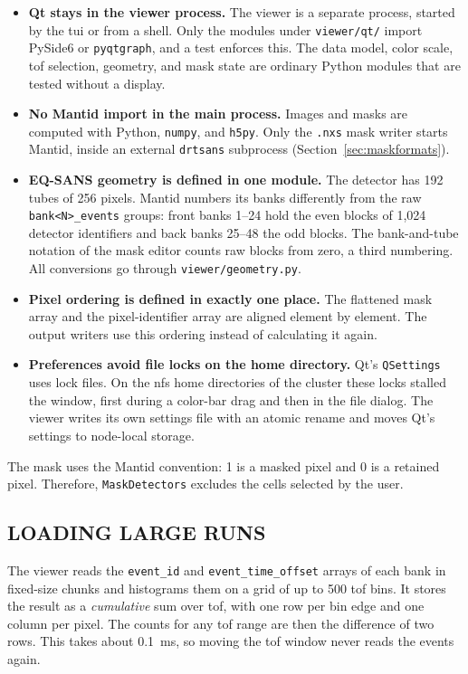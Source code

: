 \documentclass[tm]{ornltm}
\begin{document}
\begin{itemize}
  \item \textbf{Qt stays in the viewer process.} The viewer is a separate
    process, started by the \ac{tui} or from a shell. Only the modules under
    \texttt{viewer/qt/} import PySide6 or \texttt{pyqtgraph}, and a test
    enforces this. The data model, color scale, \ac{tof} selection, geometry,
    and mask state are ordinary Python modules that are tested without a
    display.
  \item \textbf{No Mantid import in the main process.} Images and masks are
    computed with Python, \texttt{numpy}, and \texttt{h5py}. Only the
    \texttt{.nxs} mask writer starts Mantid, inside an external
    \texttt{drtsans} subprocess (Section~\ref{sec:maskformats}).
  \item \textbf{EQ-SANS geometry is defined in one module.} The detector has
    192 tubes of 256 pixels. Mantid numbers its banks differently from the raw
    \texttt{bank<N>\_events} groups: front banks 1--24 hold the even blocks of
    1,024 detector identifiers and back banks 25--48 the odd blocks. The
    bank-and-tube notation of the mask editor counts raw blocks from zero, a
    third numbering. All conversions go through \texttt{viewer/geometry.py}.
  \item \textbf{Pixel ordering is defined in exactly one place.} The flattened
    mask array and the pixel-identifier array are aligned element by element.
    The output writers use this ordering instead of calculating it again.
  \item \textbf{Preferences avoid file locks on the home directory.} Qt's
    \texttt{QSettings} uses lock files. On the \ac{nfs} home directories of the
    cluster these locks stalled the window, first during a color-bar drag and
    then in the file dialog. The viewer writes its own settings file with an
    atomic rename and moves Qt's settings to node-local storage.
\end{itemize}

The mask uses the Mantid convention: 1 is a masked pixel and 0 is a retained
pixel. Therefore, \texttt{MaskDetectors} excludes the cells selected by the
user.

\subsection{LOADING LARGE RUNS}
\label{sec:viewer-load}

The viewer reads the \texttt{event\_id} and \texttt{event\_time\_offset}
arrays of each bank in fixed-size chunks and histograms them on a grid of up to 500
\ac{tof} bins. It stores the result as a \emph{cumulative} sum over \ac{tof},
with one row per bin edge and one column per pixel. The counts for any \ac{tof}
range are then the difference of two rows. This takes about 0.1~ms, so moving
the \ac{tof} window never reads the events again.
\end{document}
